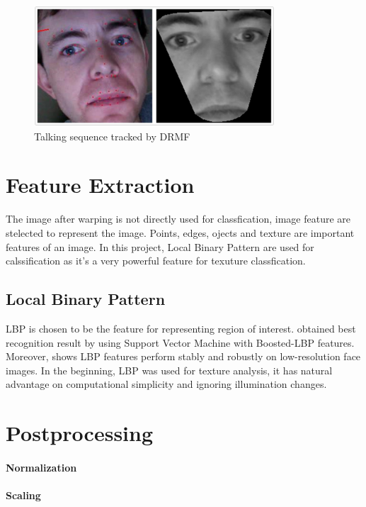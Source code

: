 \begin{figure}[ht!]
\centering
\includegraphics[width=90mm]{imgs/Warping_Intraface_213.png}
\caption{Talking sequence tracked by DRMF}
\end{figure}

\section{Feature Extraction}
The image after warping is not directly used for classfication, image feature are stelected to represent the image. Points, edges, ojects and texture are important features of an image. In this project, Local Binary Pattern are used for calssification as it's a very powerful feature for texuture classfication. 
\subsection{Local Binary Pattern}
LBP is chosen to be the feature for representing region of interest. \cite{shan2009facial} obtained best recognition result by using Support Vector Machine with Boosted-LBP features. Moreover, \cite{shan2009facial} shows LBP features perform stably and robustly on low-resolution face images. In the beginning, LBP was used for texture analysis, it has natural advantage on computational simplicity and ignoring illumination changes.
\section{Postprocessing}

\paragraph{Normalization}

\paragraph{Scaling}